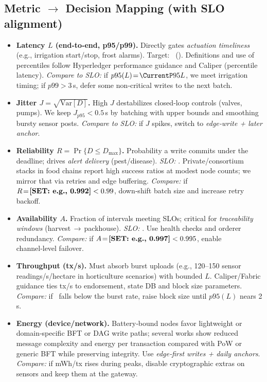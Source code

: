 \subsection{Metric $\rightarrow$ Decision Mapping (with SLO alignment)}
\label{sec:metric-decision}
\begin{itemize}
  \item \textbf{Latency $L$ (end‑to‑end, p95/p99).} Directly gates \emph{actuation timeliness} (e.g., irrigation start/stop, frost alarms). Target: \SLOpL\ (\SLOpLnn). Definitions and use of percentiles follow Hyperledger performance guidance and Caliper (percentile latency)\cite{haque2024scalable}. \emph{Compare to SLO:} if $p95(L)\!=\!\CurrentP95L$, we meet irrigation timing; if $p99>\!3$\,s, defer some non‑critical writes to the next batch.
  \item \textbf{Jitter $J\!=\!\sqrt{\mathrm{Var}[D]}$.} High $J$ destabilizes closed‑loop controls (valves, pumps). We keep $J_{p95}\!<\!0.5$\,s by batching with upper bounds and smoothing bursty sensor posts. \emph{Compare to SLO:} if $J$ spikes, switch to \emph{edge‑write + later anchor}.
  \item \textbf{Reliability $R\!=\!\Pr\{D\le D_{\max}\}$.} Probability a write commits under the deadline; drives \emph{alert delivery} (pest/disease). \emph{SLO:} \SLOR. Private/consortium stacks in food chains report high success ratios at modest node counts; we mirror that via retries and edge buffering\cite{oh2025foodsafety}. \emph{Compare:} if $R\!=\!\textbf{[SET: e.g., 0.992]}<0.99$, down‑shift batch size and increase retry backoff.
  \item \textbf{Availability $A$.} Fraction of intervals meeting SLOs; critical for \emph{traceability windows} (harvest\,$\rightarrow$\,packhouse). \emph{SLO:} \SLOA. Use health checks and orderer redundancy. \emph{Compare:} if $A\!=\!\textbf{[SET: e.g., 0.997]}<0.995$, enable channel‑level failover.
  \item \textbf{Throughput (tx/s).} Must absorb burst uploads (e.g., 120–150 sensor readings/s/hectare in horticulture scenarios) with bounded $L$. Caliper/Fabric guidance ties tx/s to endorsement, state DB and block size parameters\cite{haque2024scalable}. \emph{Compare:} if \CurrentTPS\ falls below the burst rate, raise block size until $p95(L)$ nears 2\,s.
  \item \textbf{Energy (device/network).} Battery‑bound nodes favor lightweight or domain‑specific BFT or DAG write paths; several works show reduced message complexity and energy per transaction compared with PoW or generic BFT while preserving integrity\cite{coinspaid2023dag}. Use \emph{edge‑first writes + daily anchors}. \emph{Compare:} if mWh/tx rises during peaks, disable cryptographic extras on sensors and keep them at the gateway.
\end{itemize}

